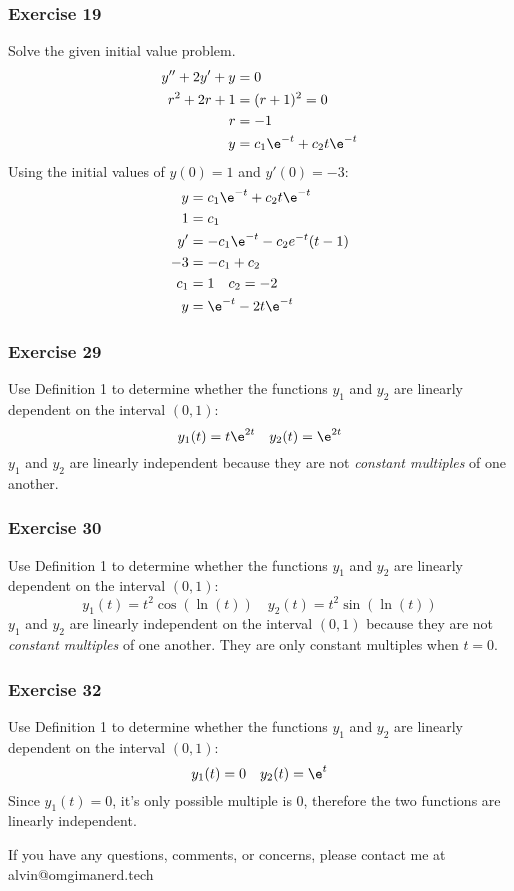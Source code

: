 \documentclass{math}
\begin{document}
\subsubsection*{Exercise 19}
Solve the given initial value problem.
\begin{align*}
  y''+2y'+y &= 0 \\
  r^2+2r+1 &= (r+1)^2 = 0 \\
  r &= -1 \\
  y &= c_1\e^{-t}+c_2t\e^{-t}
\end{align*}
Using the initial values of \( y(0) = 1 \) and \( y'(0) = -3 \):
\begin{align*}
  y &= c_1\e^{-t}+c_2t\e^{-t} \\
  1 &= c_1 \\
  y' &= -c_1\e^{-t}-c_2e^{-t}(t-1) \\
  -3 &= -c_1+c_2 \\
  c_1 &= 1 \quad c_2 = -2 \\
  y &= \e^{-t}-2t\e^{-t}
\end{align*}

\subsubsection*{Exercise 29}
Use Definition 1 to determine whether the functions \( y_1 \) and \( y_2 \) are
linearly dependent on the interval \( (0,1) \):
\[ y_1(t) = t\e^{2t} \quad y_2(t) = \e^{2t} \]
\( y_1 \) and \( y_2 \) are linearly independent because they are not
\textit{constant multiples} of one another.

\subsubsection*{Exercise 30}
Use Definition 1 to determine whether the functions \( y_1 \) and \( y_2 \) are
linearly dependent on the interval \( (0,1) \):
\[ y_1(t) = t^2\cos(\ln(t)) \quad y_2(t) = t^2\sin(\ln(t)) \]
\( y_1 \) and \( y_2 \) are linearly independent on the interval \( (0,1) \)
because they are not \textit{constant multiples} of one another. They are
only constant multiples when \( t = 0 \).

\subsubsection*{Exercise 32}
Use Definition 1 to determine whether the functions \( y_1 \) and \( y_2 \) are
linearly dependent on the interval \( (0,1) \):
\[ y_1(t) = 0 \quad y_2(t) = \e^t \]
Since \( y_1(t) = 0 \), it's only possible multiple is 0, therefore the two
functions are linearly independent.

\begin{center}
  If you have any questions, comments, or concerns, please contact me at
  alvin@omgimanerd.tech
\end{center}
\end{document}
